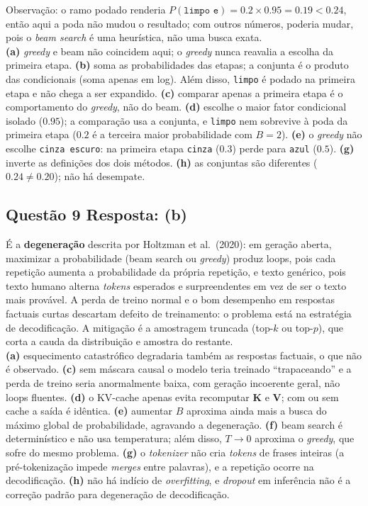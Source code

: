 \documentclass[11pt,a4paper]{article}
\begin{document}
Observação: o ramo podado renderia $P(\texttt{limpo e}) = 0.2 \times 0.95 = 0.19 < 0.24$, então aqui a poda não mudou o resultado; com outros números, poderia mudar, pois o \textit{beam search} é uma heurística, não uma busca exata.\\
\textbf{(a)} \textit{greedy} e beam não coincidem aqui; o \textit{greedy} nunca reavalia a escolha da primeira etapa.
\textbf{(b)} soma as probabilidades das etapas; a conjunta é o produto das condicionais (soma apenas em log). Além disso, \texttt{limpo} é podado na primeira etapa e não chega a ser expandido.
\textbf{(c)} comparar apenas a primeira etapa é o comportamento do \textit{greedy}, não do beam.
\textbf{(d)} escolhe o maior fator condicional isolado ($0.95$); a comparação usa a conjunta, e \texttt{limpo} nem sobrevive à poda da primeira etapa ($0.2$ é a terceira maior probabilidade com $B = 2$).
\textbf{(e)} o \textit{greedy} não escolhe \texttt{cinza escuro}: na primeira etapa \texttt{cinza} ($0.3$) perde para \texttt{azul} ($0.5$).
\textbf{(g)} inverte as definições dos dois métodos.
\textbf{(h)} as conjuntas são diferentes ($0.24 \neq 0.20$); não há desempate.

\subsection*{Questão 9 \textemdash{} Resposta: (b)}
É a \textbf{degeneração} descrita por Holtzman et al.\ (2020): em geração aberta, maximizar a probabilidade (beam search ou \textit{greedy}) produz loops, pois cada repetição aumenta a probabilidade da própria repetição, e texto genérico, pois texto humano alterna \textit{tokens} esperados e surpreendentes em vez de ser o texto mais provável. A perda de treino normal e o bom desempenho em respostas factuais curtas descartam defeito de treinamento: o problema está na estratégia de decodificação. A mitigação é a amostragem truncada (top-$k$ ou top-$p$), que corta a cauda da distribuição e amostra do restante.\\
\textbf{(a)} esquecimento catastrófico degradaria também as respostas factuais, o que não é observado.
\textbf{(c)} sem máscara causal o modelo teria treinado ``trapaceando'' e a perda de treino seria anormalmente baixa, com geração incoerente geral, não loops fluentes.
\textbf{(d)} o KV-cache apenas evita recomputar $\mathbf{K}$ e $\mathbf{V}$; com ou sem cache a saída é idêntica.
\textbf{(e)} aumentar $B$ aproxima ainda mais a busca do máximo global de probabilidade, agravando a degeneração.
\textbf{(f)} beam search é determinístico e não usa temperatura; além disso, $T \to 0$ aproxima o \textit{greedy}, que sofre do mesmo problema.
\textbf{(g)} o \textit{tokenizer} não cria \textit{tokens} de frases inteiras (a pré-tokenização impede \textit{merges} entre palavras), e a repetição ocorre na decodificação.
\textbf{(h)} não há indício de \textit{overfitting}, e \textit{dropout} em inferência não é a correção padrão para degeneração de decodificação.
\end{document}
